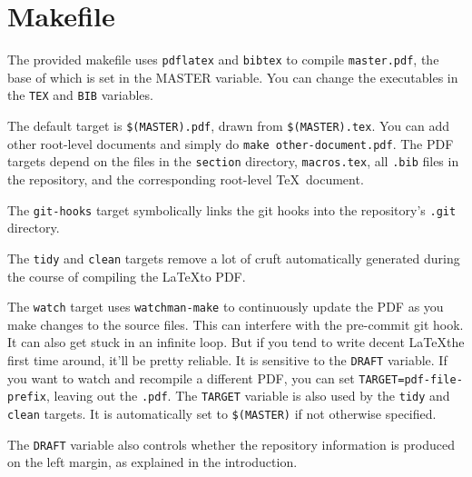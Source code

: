 \section{Makefile}

The provided makefile uses \texttt{pdflatex} and \texttt{bibtex} to compile \texttt{master.pdf}, the base of which is set in the MASTER variable.
You can change the executables in the \texttt{TEX} and \texttt{BIB} variables.

The default target is \texttt{\$(MASTER).pdf}, drawn from \texttt{\$(MASTER).tex}.
You can add other root-level documents and simply do \texttt{make other-document.pdf}.
The PDF targets depend on the files in the \texttt{section} directory, \texttt{macros.tex}, all \texttt{.bib} files in the repository, and the corresponding root-level \TeX\ document.

The \texttt{git-hooks} target symbolically links the git hooks into the repository's \texttt{.git} directory.

The \texttt{tidy} and \texttt{clean} targets remove a lot of cruft automatically generated during the course of compiling the \LaTeX to PDF.

The \texttt{watch} target uses \texttt{watchman-make}\cite{watchman} to continuously update the PDF as you make changes to the source files.
This can interfere with the pre-commit git hook.
It can also get stuck in an infinite loop.
But if you tend to write decent \LaTeX the first time around, it'll be pretty reliable.
It is sensitive to the \texttt{DRAFT} variable.
If you want to watch and recompile a different PDF, you can set \texttt{TARGET=pdf-file-prefix}, leaving out the \texttt{.pdf}.
The \texttt{TARGET} variable is also used by the \texttt{tidy} and \texttt{clean} targets.
It is automatically set to \texttt{\$(MASTER)} if not otherwise specified.

The \texttt{DRAFT} variable also controls whether the \git repository information is produced on the left margin, as explained in the introduction.
